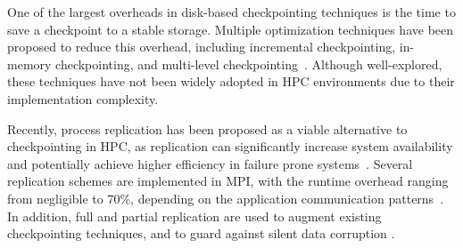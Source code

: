 One of the largest overheads in disk-based checkpointing techniques is the time to save a checkpoint
to a stable storage. %
Multiple optimization techniques have been proposed to reduce this overhead, including incremental checkpointing, in-memory checkpointing, and multi-level checkpointing~\cite{Gao:2015:RIC:2751205.2751212,Agarwal:04:Adaptive,zheng2004ftc,Moody:10:SCR}.
 Although well-explored, these techniques have not been widely adopted
in HPC environments due to their implementation complexity. 

Recently, process replication has been proposed as a viable alternative to checkpointing in HPC, as replication can significantly increase system availability and potentially achieve higher efficiency in failure prone systems~\cite{riesen_sandia_2010,Cappello:09:Fault}. Several replication schemes are implemented in MPI, with the runtime overhead ranging from negligible to 70\%, depending on the application communication patterns~\cite{engelmann2011redundant,ferreira_sc_2011}.
In addition, full and partial replication are used to augment existing checkpointing techniques, and to guard
against silent data corruption \cite{elliott_2012_cpr,ni_2013_acr,fiala_2012_sdc}.


